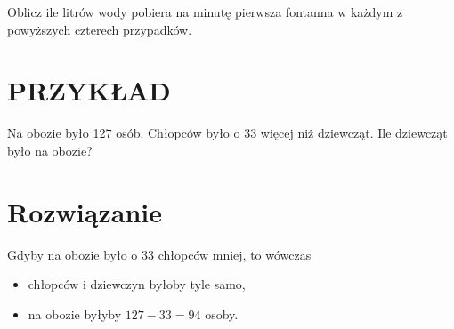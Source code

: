 \documentclass[10pt]{article}
\begin{document}
Oblicz ile litrów wody pobiera na minutę pierwsza fontanna w każdym z powyższych czterech przypadków.

\section*{PRZYKŁAD}
Na obozie było 127 osób. Chłopców było o 33 więcej niż dziewcząt. Ile dziewcząt było na obozie?

\section*{Rozwiązanie}
Gdyby na obozie było o 33 chłopców mniej, to wówczas

\begin{itemize}
  \item chłopców i dziewczyn byłoby tyle samo,
  \item na obozie byłyby \(127-33=94\) osoby.
\end{itemize}
\end{document}
